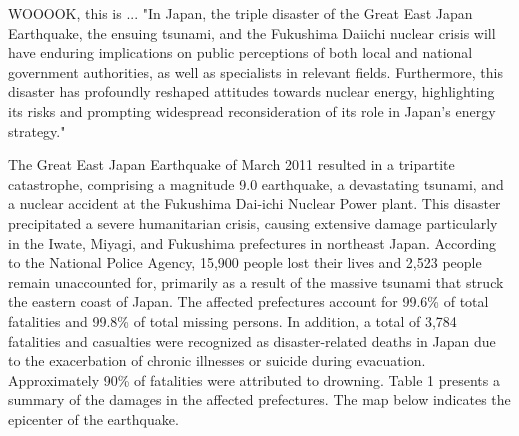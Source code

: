 \documentclass[12pt,halfline,a4paper]{ouparticle}
\begin{document}
 WOOOOK, this is ... "In Japan, the triple disaster of the Great East Japan Earthquake, the ensuing tsunami, and the Fukushima Daiichi nuclear crisis will have enduring implications on public perceptions of both local and national government authorities, as well as specialists in relevant fields. Furthermore, this disaster has profoundly reshaped attitudes towards nuclear energy, highlighting its risks and prompting widespread reconsideration of its role in Japan's energy strategy."




The Great East Japan Earthquake of March 2011 resulted in a tripartite catastrophe, comprising a magnitude 9.0 earthquake, a devastating tsunami, and a nuclear accident at the Fukushima Dai-ichi Nuclear Power plant. This disaster precipitated a severe humanitarian crisis, causing extensive damage particularly in the Iwate, Miyagi, and Fukushima prefectures in northeast Japan. According to the National Police Agency, 15,900 people lost their lives and 2,523 people remain unaccounted for, primarily as a result of the
massive tsunami that struck the eastern coast of Japan. The affected
prefectures account for 99.6\% of total fatalities and 99.8\% of total missing persons. In addition, a total of 3,784 fatalities and casualties were recognized as disaster-related deaths in Japan due to the exacerbation of chronic illnesses or suicide during evacuation. Approximately 90\% of fatalities were attributed to drowning. Table 1 presents a summary of the damages in the affected prefectures. The map below indicates the epicenter of the earthquake.
\end{document}
